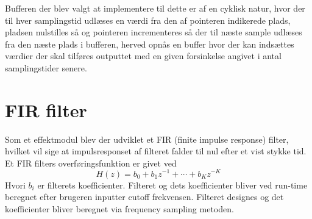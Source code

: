 Bufferen der blev valgt at implementere til dette er af en cyklisk natur, hvor der til hver samplingstid udlæses en værdi fra den af pointeren indikerede plads, pladsen nulstilles så og pointeren incrementeres så der til næste sample udlæses fra den næste plads i bufferen, herved opnås en buffer hvor der kan indsættes værdier der skal tilføres outputtet med en given forsinkelse angivet i antal samplingstider senere. 



\section{FIR filter}
Som et effektmodul blev der udviklet et FIR (finite impulse response) filter, hvilket vil sige at impulsresponset af filteret falder til nul efter et vist stykke tid.\newline
Et FIR filters overføringsfunktion er givet ved
\begin{equation}
H(z) = b_0 + b_1z^{-1} + \cdots + b_Kz^{-K}
\end{equation}
Hvori $b_i$ er filterets koefficienter.\cite[p.218]{Tan2013}\newline
Filteret og dets koefficienter bliver ved run-time beregnet efter brugeren inputter cutoff frekvensen. Filteret designes og det koefficienter bliver beregnet via frequency sampling metoden.

